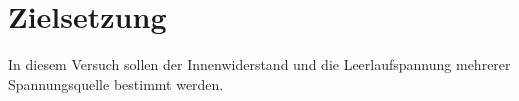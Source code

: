 \setcounter{page}{1}
\section{Zielsetzung}
\label{sec:Zielsetzung}

In diesem Versuch sollen der Innenwiderstand und die Leerlaufspannung mehrerer Spannungsquelle bestimmt werden.
